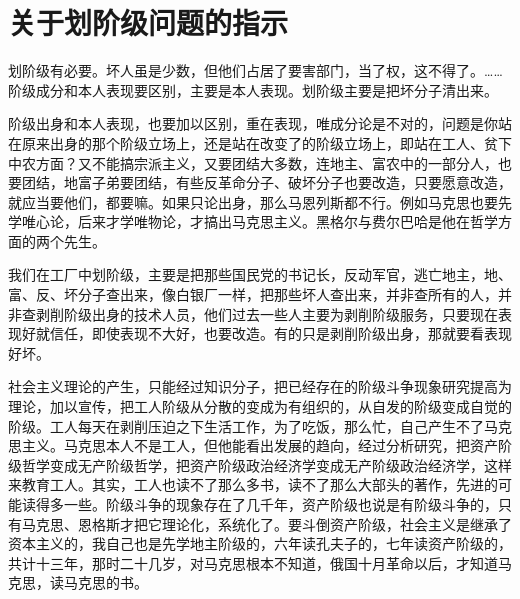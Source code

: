 \section[关于划阶级问题的指示（时间不详）]{关于划阶级问题的指示}


划阶级有必要。坏人虽是少数，但他们占居了要害部门，当了权，这不得了。……阶级成分和本人表现要区别，主要是本人表现。划阶级主要是把坏分子清出来。

阶级出身和本人表现，也要加以区别，重在表现，唯成分论是不对的，问题是你站在原来出身的那个阶级立场上，还是站在改变了的阶级立场上，即站在工人、贫下中农方面？又不能搞宗派主义，又要团结大多数，连地主、富农中的一部分人，也要团结，地富子弟要团结，有些反革命分子、破坏分子也要改造，只要愿意改造，就应当要他们，都要嘛。如果只论出身，那么马恩列斯都不行。例如马克思也要先学唯心论，后来才学唯物论，才搞出马克思主义。黑格尔与费尔巴哈是他在哲学方面的两个先生。

我们在工厂中划阶级，主要是把那些国民党的书记长，反动军官，逃亡地主，地、富、反、坏分子查出来，像白银厂一样，把那些坏人查出来，并非查所有的人，并非查剥削阶级出身的技术人员，他们过去一些人主要为剥削阶级服务，只要现在表现好就信任，即使表现不大好，也要改造。有的只是剥削阶级出身，那就要看表现好坏。

社会主义理论的产生，只能经过知识分子，把已经存在的阶级斗争现象研究提高为理论，加以宣传，把工人阶级从分散的变成为有组织的，从自发的阶级变成自觉的阶级。工人每天在剥削压迫之下生活工作，为了吃饭，那么忙，自己产生不了马克思主义。马克思本人不是工人，但他能看出发展的趋向，经过分析研究，把资产阶级哲学变成无产阶级哲学，把资产阶级政治经济学变成无产阶级政治经济学，这样来教育工人。其实，工人也读不了那么多书，读不了那么大部头的著作，先进的可能读得多一些。阶级斗争的现象存在了几千年，资产阶级也说是有阶级斗争的，只有马克思、恩格斯才把它理论化，系统化了。要斗倒资产阶级，社会主义是继承了资本主义的，我自己也是先学地主阶级的，六年读孔夫子的，七年读资产阶级的，共计十三年，那时二十几岁，对马克思根本不知道，俄国十月革命以后，才知道马克思，读马克思的书。

